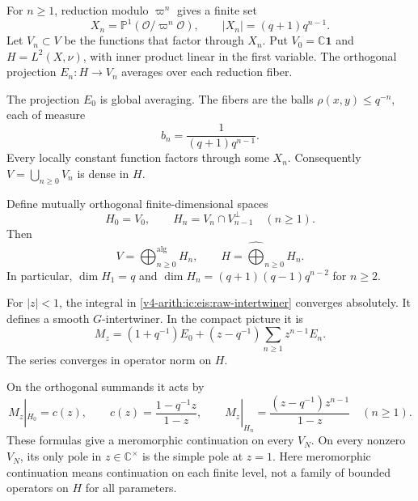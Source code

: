 For $n\ge1$, reduction modulo $\varpi^n$ gives a finite set
\[
 X_n=\mathbb P^1(\mathcal O/\varpi^n\mathcal O),\qquad
 |X_n|=(q+1)q^{n-1}.
\]
Let $V_n\subset V$ be the functions that factor through $X_n$.
Put $V_0=\mathbb C\mathbf1$ and
$H=L^2(X,\nu)$, with inner product linear in the first variable.
The orthogonal projection $E_n:H\to V_n$ averages over each reduction fiber.

The projection $E_0$ is global averaging.
The fibers are the balls $\rho(x,y)\le q^{-n}$, each of measure
\[
 b_n=\frac{1}{(q+1)q^{n-1}}.
\]
Every locally constant function factors through some $X_n$.
Consequently $V=\bigcup_{n\ge0}V_n$ is dense in $H$.

Define mutually orthogonal finite-dimensional spaces
\[
 H_0=V_0,\qquad H_n=V_n\cap V_{n-1}^{\perp}\quad(n\ge1).
\]
Then
\[
 V=\bigoplus_{n\ge0}^{\mathrm{alg}}H_n,
 \qquad H=\widehat{\bigoplus}_{n\ge0}H_n.
\]
In particular, $\dim H_1=q$ and
$\dim H_n=(q+1)(q-1)q^{n-2}$ for $n\ge2$.

\begin{lemma}
\label{v4-arith:ic:eis:kernel}
For $|z|<1$, the integral in
\eqref{v4-arith:ic:eis:raw-intertwiner} converges absolutely.
It defines a smooth $G$-intertwiner.
In the compact picture it is
\begin{equation}
\label{v4-arith:ic:eis:projection-expansion}
 M_z=(1+q^{-1})E_0+(z-q^{-1})\sum_{n\ge1}z^{n-1}E_n.
\end{equation}
The series converges in operator norm on $H$.

On the orthogonal summands it acts by
\[
 M_z|_{H_0}=c(z),\qquad
 c(z)=\frac{1-q^{-1}z}{1-z},\qquad
 M_z|_{H_n}=\frac{(z-q^{-1})z^{n-1}}{1-z}\quad(n\ge1).
\]
These formulas give a meromorphic continuation on every $V_N$.
On every nonzero $V_N$, its only pole in $z\in\mathbb C^\times$
is the simple pole at $z=1$.
Here meromorphic continuation means continuation on each finite level,
not a family of bounded operators on $H$ for all parameters.
\end{lemma}

